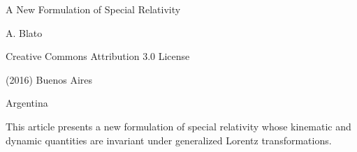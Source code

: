 \documentclass[10pt,fleqn]{article}
\begin{document}
\begin{center}

{\fontsize{10.98}{10.98}\selectfont \sc A New Formulation of Special Relativity}

\bigskip \medskip

{A. Blato}

\bigskip \medskip

\small

Creative Commons Attribution 3.0 License

\smallskip

(2016) Buenos Aires

\medskip

Argentina

\smallskip

\bigskip \medskip

\parbox{78.00mm}{This article presents a new formulation of special relativity whose kinematic and dynamic quantities are invariant under generalized Lorentz transformations.}

\end{center}

\normalsize

\vspace{-1.20em}

\par {}

\bigskip \smallskip
\end{document}
